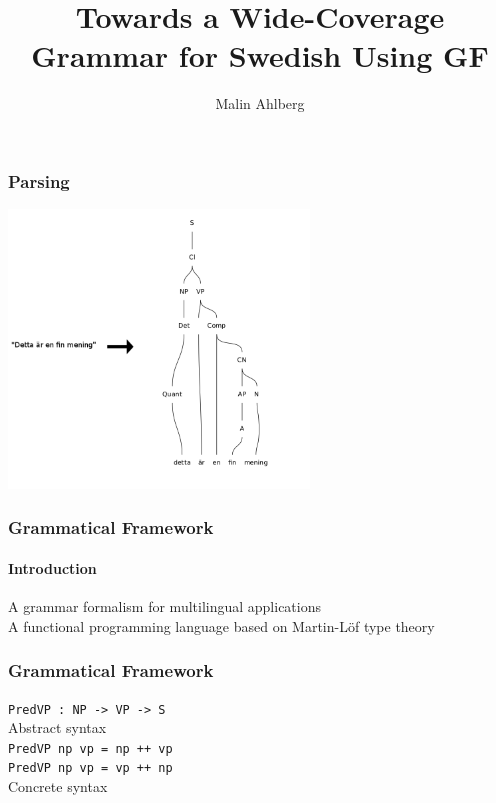 \documentclass[10pt]{beamer}
\title{Towards a Wide-Coverage Grammar for Swedish Using GF}
\author{Malin Ahlberg}
\date{}
\begin{document}
\maketitle

\begin{frame}
    \frametitle{Parsing}
\begin{center}
\includegraphics[width=80mm]{sentence.png}\\
\end{center}
 \end{frame}


 \begin{frame}
  \frametitle{Grammatical Framework}
  \framesubtitle{Introduction}
  A grammar formalism for multilingual applications\\
  \pause
  \vspace{5mm}
  A functional programming language  based on Martin-Löf type theory\\
 \end{frame}


\begin{frame}[containsverbatim]
  \frametitle{Grammatical Framework}
  \verb|PredVP : NP -> VP -> S|\\
  Abstract syntax\\
  \vspace{5mm}
  \verb|PredVP np vp = np ++ vp |\\
  \verb|PredVP np vp = vp ++ np |\\
  Concrete syntax
 \end{frame}
\end{document}

